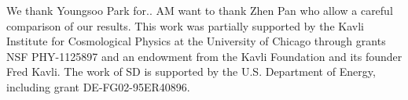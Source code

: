 \documentclass[aps,prd,preprint,groupedaddress]{revtex4-1}
\begin{document}
\begin{acknowledgments}
We thank Youngsoo Park for..
AM want to thank Zhen Pan who allow a careful comparison of our results.
This work was partially supported by the Kavli Institute for Cosmological Physics at the University of Chicago through grants NSF PHY-1125897 and an endowment from the Kavli Foundation and its founder Fred Kavli.
The work of SD is supported by the U.S. Department of Energy, including grant DE-FG02-95ER40896.
\end{acknowledgments}


\end{document}
